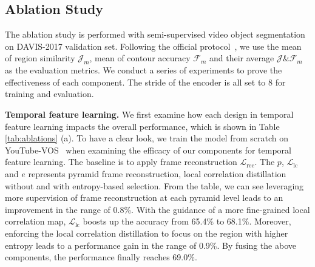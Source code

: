 \documentclass{article}
\begin{document}
 \subsection{Ablation Study}
 The ablation study is performed with semi-supervised video object segmentation~\cite{pont20172017} on DAVIS-2017 validation set. Following the official protocol~\cite{pont20172017}, we use the mean of region similarity $\mathcal{J}_m$, mean of contour accuracy $\mathcal{F}_m$ and their average $\mathcal{J} \& \mathcal{F}_m$ as the evaluation metrics. We conduct a series of experiments to prove the effectiveness of each component. The stride of the encoder is all set to 8 for training and evaluation.
 
 
 \textbf{Temporal feature learning.} We first examine how each design in temporal feature learning impacts the overall performance, which is shown in Table \ref{tab:ablations} (a). To have a clear look, we train the model from scratch on YouTube-VOS~\cite{xu2018youtube} when examining the efficacy of our components for temporal feature learning. The baseline is to apply frame reconstruction $\mathcal{L}_{\mathrm{rec}}$. The $p$, $\mathcal{L}_{\mathrm{lc}}$ and $e$ represents pyramid frame reconstruction, local correlation distillation without and with entropy-based selection. From the table, we can see leveraging more supervision of frame reconstruction at each pyramid level leads to an improvement in the range of 0.8\%. With the guidance of a more fine-grained local correlation map, $\mathcal{L}_{\mathrm{lc}}$ boosts up the accuracy from 65.4\% to 68.1\%. Moreover, enforcing the local correlation distillation to focus on the region with higher entropy leads to a performance gain in the range of 0.9\%. By fusing the above components, the performance finally reaches 69.0\%.
 
\end{document}
